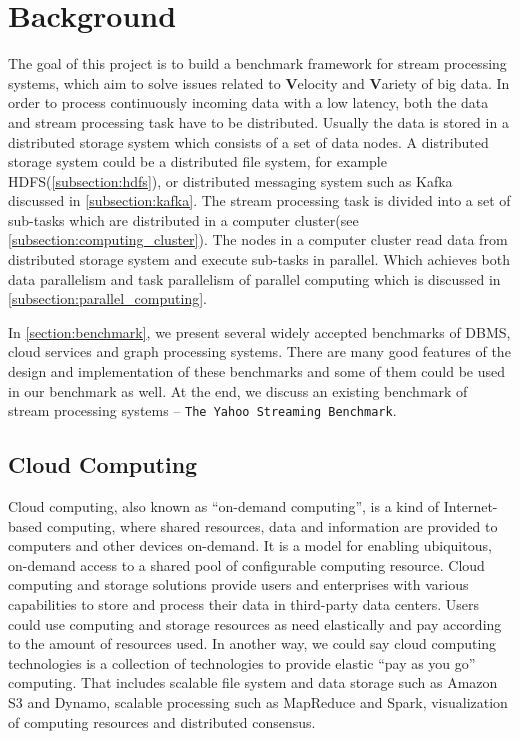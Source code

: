 \chapter{Background}
The goal of this project is to build a benchmark framework for stream processing systems, which aim to solve issues related to \textbf{V}elocity and \textbf{V}ariety of big data\cite{GameChanger}. In order to process continuously incoming data with a low latency, both the data and stream processing task have to be distributed. Usually the data is stored in a distributed storage system which consists of a set of data nodes. A distributed storage system could be a distributed file system, for example HDFS(\cref{subsection:hdfs}), or distributed messaging system such as Kafka discussed in \cref{subsection:kafka}. The stream processing task is divided into a set of sub-tasks which are distributed in a computer cluster(see \cref{subsection:computing_cluster}). The nodes in a computer cluster read data from distributed storage system and execute sub-tasks in parallel. Which achieves both data parallelism and task parallelism of parallel computing which is discussed in \cref{subsection:parallel_computing}.
 
In \cref{section:benchmark}, we present several widely accepted benchmarks of DBMS, cloud services and graph processing systems. There are many good features of the design and implementation of these benchmarks and some of them could be used in our benchmark as well. At the end, we discuss an existing benchmark of stream processing systems -- \texttt{The Yahoo Streaming Benchmark}. 
 

\section{Cloud Computing}
Cloud computing, also known as ``on-demand computing'', is a kind of Internet-based computing, where shared resources, data and information are provided to computers and other devices on-demand. It is a model for enabling ubiquitous, on-demand access to a shared pool of configurable computing resource\cite{neto2011demystifying, mell2011nist}. Cloud computing and storage solutions provide users and enterprises with various capabilities to store and process their data in third-party data centers\cite{haghighat2015cloudid}. Users could use computing and storage resources as need elastically and pay according to the amount of resources used. In another way, we could say cloud computing technologies is a collection of technologies to provide elastic ``pay as you go'' computing. That includes scalable file system and data storage such as Amazon S3 and Dynamo, scalable processing such as MapReduce and Spark, visualization of computing resources and distributed consensus. 

